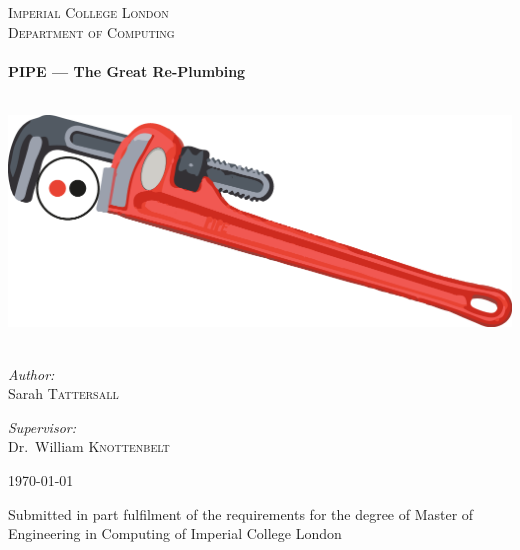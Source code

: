 \begin{titlepage}
\begin{center}



\textsc{\LARGE Imperial College London}\\[1.5cm]

\textsc{\Large Department of Computing}\\[0.5cm]

\HRule \\[0.4cm]
{ \huge \bfseries PIPE --- The Great Re-Plumbing \\[0.4cm] }

\HRule \\[1.5cm]

\includegraphics[scale=0.7]{images/pipe_wrench.png}~\\[1cm]

\begin{minipage}{0.4\textwidth}
\begin{flushleft} \large
\emph{Author:}\\
Sarah \textsc{Tattersall}
\end{flushleft}
\end{minipage}
\begin{minipage}{0.4\textwidth}
\begin{flushright} \large
\emph{Supervisor:} \\
Dr.~William \textsc{Knottenbelt}
\end{flushright}
\end{minipage}

\vfill

{\large \monthyear\today}

Submitted in part fulfilment of the requirements for the degree of
Master of Engineering in Computing of Imperial College London


\end{center}
\end{titlepage}